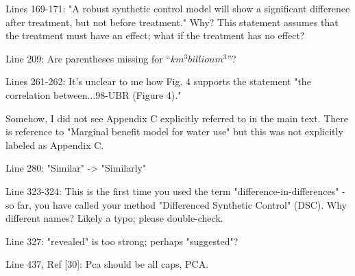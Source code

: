 \RC{} Lines 169-171: "A robust synthetic control model will show a significant difference after treatment, but not before treatment." Why? This statement assumes that the treatment must have an effect; what if the treatment has no effect?

\RC{} Line 209: Are parentheses missing for ``$km^3 billion m^3$''?

\RC{} Lines 261-262: It's unclear to me how Fig. 4 supports the statement "the correlation between...98-UBR (Figure 4)."

\RC{} Somehow, I did not see Appendix C explicitly referred to in the main text. There is reference to "Marginal benefit model for water use" but this was not explicitly labeled as Appendix C.

\RC{} Line 280: "Similar" -> "Similarly"

\RC{} Line 323-324: This is the first time you used the term "difference-in-differences" - so far, you have called your method "Differenced Synthetic Control" (DSC). Why different names? Likely a typo; please double-check.

\RC{} Line 327: "revealed" is too strong; perhaps "suggested"?

\RC{} Line 437, Ref [30]: Pca should be all caps, PCA.\
